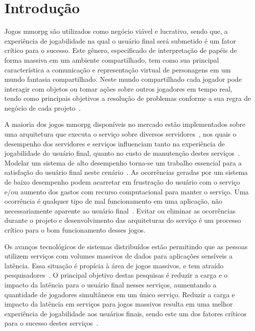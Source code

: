 \chapter{Introdução}
\label{introducao}


Jogos \acf{mmorpg} são utilizados como negócio viável e lucrativo, sendo que, a experiência de jogabilidade na qual o usuário final será submetido é um fator crítico para o sucesso.
%
Este gênero, especificado de interpretação de papéis de forma massiva em um ambiente compartilhado, tem como sua principal característica a comunicação e representação virtual de personagens em um mundo fantasia compartilhado.
%
Neste mundo compartilhado cada jogador pode interagir com objetos ou tomar ações sobre outros jogadores em tempo real, tendo como principais objetivos a resolução de problemas conforme a sua regra de negócio de cada projeto~\cite{video_game_technologies}.



A maioria dos jogos \ac{mmorpg} disponíveis no mercado estão implementados sobre uma arquitetura que executa o serviço sobre diversos servidores~\cite{stephenclarkewillson2017}, nos quais o desempenho dos servidores e serviços influenciam tanto na experiência de jogabilidade do usuário final, quanto no custo de manutenção destes serviços~\cite{1417630}.
%
Modelar um sistema de alto desempenho torna-se um trabalho essencial para a satisfação do usuário final neste cenário~\cite{1417630}.
%
As ocorrências geradas por um sistema de baixo desempenho podem acarretar em frustração do usuário com o serviço e/ou aumento dos gastos com recurso computacional para manter o serviço.
%
Uma ocorrência é qualquer tipo de mal funcionamento em uma aplicação, não necessariamente aparente ao usuário final~\cite{1417630}.
%
Evitar ou eliminar as ocorrências durante o projeto e desenvolvimento das arquiteturas do serviço é um processo crítico para o bom funcionamento desses jogos.


Os avanços tecnológicos de sistemas distribuídos estão permitindo que as pessoas utilizem serviços com volumes massivos de dados para aplicações sensíveis a latência.
%
Essa situação é propícia à área de jogos massivos, e tem atraído pesquisadores~\cite{mmo_analytic,1417630,6267019,6063041}.
%
O principal objetivo destas pesquisas é reduzir a carga e o impacto da latência para o usuário final nesses serviços, aumentando a quantidade de jogadores simultâneos em um único serviço.
%
Reduzir a carga e impacto da latência em serviços para jogos massivos resulta em uma melhor experiência de jogabilidade aos usuários finais, sendo este um dos fatores críticos para o sucesso destes serviços~\cite{1417630}.


